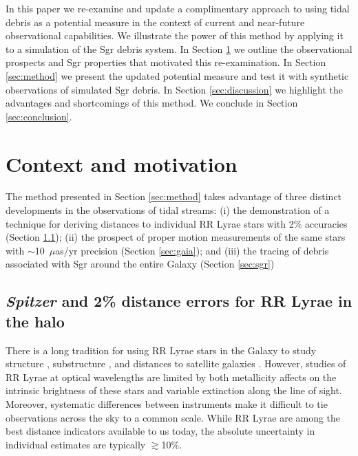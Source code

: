 \documentclass[preprint]{aastex}
\begin{document}
In this paper we re-examine and update a complimentary approach to using tidal debris as a potential measure \citep[originially proposed by][]{johnston99a}  in the context of current and near-future observational capabilities. We illustrate the power of this method by applying it to a simulation of the Sgr debris system.
In Section \ref{sec:context} we outline the observational prospects and Sgr properties that motivated this re-examination.
In Section \ref{sec:method} we present the updated potential measure and test it with synthetic observations of simulated Sgr debris.
In Section \ref{sec:discussion} we highlight the advantages and shortcomings of this method.
We conclude in Section \ref{sec:conclusion}.

%

\section{Context and motivation} \label{sec:context}
The method presented in Section \ref{sec:method} takes advantage of
three distinct developments in the observations of tidal streams: (i)
the demonstration of a technique for deriving distances to individual
RR Lyrae stars with 2\% accuracies (Section \ref{sec:spitzer}); (ii)
the prospect of proper motion measurements of the same stars with
$\sim$10~$\mu$as/yr precision (Section \ref{sec:gaia}); and (iii) the
tracing of debris associated with Sgr around the entire Galaxy
(Section \ref{sec:sgr})

\subsection{{\it Spitzer} and 2\% distance errors for RR Lyrae in the halo}
\label{sec:spitzer}

There is a long tradition for using RR Lyrae stars in the Galaxy to
study structure \citep[going back to first estimates of the distance
  to the Galactic center][]{shapley18}, substructure
\citep[e.g.][]{sesar10}, and distances to satellite galaxies
\citep[e.g.][]{clementini03}.  However, studies of RR Lyrae at optical
wavelengths are limited by both metallicity affects on the intrinsic
brightness of these stars and variable extinction along the line of
sight.  Moreover, systematic differences between instruments make it
difficult to tie observations across the sky to a common scale. While
RR Lyrae are among the best distance indicators available to us today,
the absolute uncertainty in individual estimates are typically
$\gtrsim$10\%.
\end{document}
